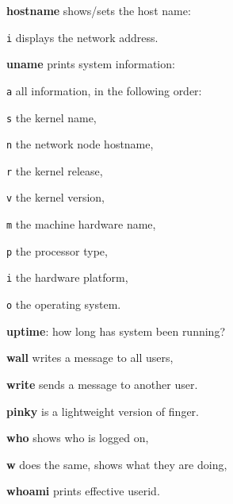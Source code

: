 \begin{compactenum}
	\item [\cmdvar] \textbf{hostname} shows/sets the host name:
	\item [\texttt{i}] displays the network address.
	\item [\cmdcore] \textbf{uname} prints system information:
	\item [\texttt{a}] all information, in the following order:
	\item [\texttt{s}] the kernel name,
	\item [\texttt{n}] the network node hostname,
	\item [\texttt{r}] the kernel release,
	\item [\texttt{v}] the kernel version,
	\item [\texttt{m}] the machine hardware name,
	\item [\texttt{p}] the processor type,
	\item [\texttt{i}] the hardware platform,
	\item [\texttt{o}] the operating system.
\end{compactenum}

\begin{compactenum}
	\item [\cmdcore] \textbf{uptime}: how long has system been running?
\end{compactenum}

\begin{compactenum}
	\item [\cmdutil] \textbf{wall} writes a message to all users,
	\item [\cmdvar] \textbf{write} sends a message to another user. 
\end{compactenum}

\begin{compactenum}
	\item [\cmdvar] \textbf{pinky} is a lightweight version of finger.
	\item [\cmdvar] \textbf{who} shows who is logged on,
	\item [\cmdvar] \textbf{w} does the same, shows what they are doing,
	\item [\cmdvar] \textbf{whoami} prints effective userid.
\end{compactenum}

\vfill\null
\columnbreak
